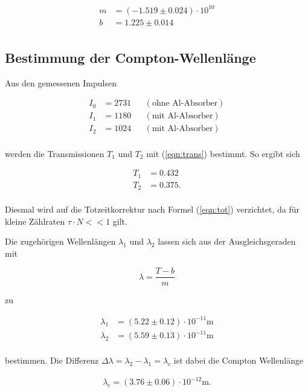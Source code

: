 \begin{align*}
    m &= (-1.519 \pm 0.024)\cdot 10^{10} \\
    b &= 1.225 \pm 0.014 \\
\end{align*}

\subsection{Bestimmung der Compton-Wellenlänge}
Aus den gemessenen Impulsen 

\begin{align*}
    I_0 &= 2731 & &(\text{ohne Al-Absorber})\\
    I_1 &= 1180 & &(\text{mit Al-Absorber})\\
    I_2 &= 1024 & &(\text{mit Al-Absorber})\\  
\end{align*}

\noindent
werden die Transmissionen $T_1$ und $T_2$ mit (\ref{eqn:trans}) bestimmt. So ergibt sich

\begin{align*}
    T_1 &= 0.432 \\
    T_2 &= 0.375.\\
\end{align*}

\noindent
Diesmal wird auf die Totzeitkorrektur nach Formel (\ref{eqn:tot}) verzichtet, da für kleine Zählraten $\tau \cdot N << 1$ gilt.

\noindent
Die zugehörigen Wellenlängen $\lambda_1$ und $\lambda_2$ lassen sich aus der Ausgleichsgeraden
mit 

\begin{equation*}
    \lambda = \frac{T - b}{m}
\end{equation*}

\noindent
zu

\begin{align*}
    \lambda_1 &= (5.22\pm 0.12)\cdot 10^{-11} \si{\meter}\\
    \lambda_2 &= (5.59\pm 0.13)\cdot 10^{-11} \si{\meter}\\
\end{align*}

\noindent
bestimmen.
Die Differenz $\Delta \lambda = \lambda_2 - \lambda_1 = \lambda_c$ ist dabei die Compton Wellenlänge

\begin{align*}
    \lambda_c =(3.76\pm 0.06)\cdot 10^{-12} \si{\meter}.
\end{align*}

